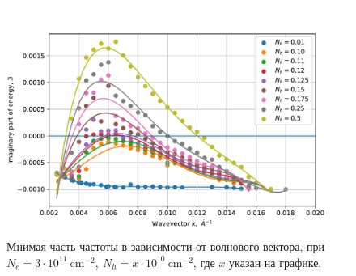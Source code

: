 \documentclass[../main.tex]{subfiles}
\begin{document}
    \begin{figure}[h]
        \begin{minipage}[h]{1\textwidth}
            \includegraphics[width=1\textwidth]{./images/plazmon6nm3neXnpim.pdf}
            \caption{Мнимая часть частоты в зависимости от волнового вектора, при $N_e = 3 \cdot 10^{11}~\text{cm}^{-2},~N_h = x \cdot 10^{10}~\text{cm}^{-2}$,
            где $x$ указан на графике.\label{plasmon:6nm3neXnpim}}
        \end{minipage}
    \end{figure}
    
\end{document}
